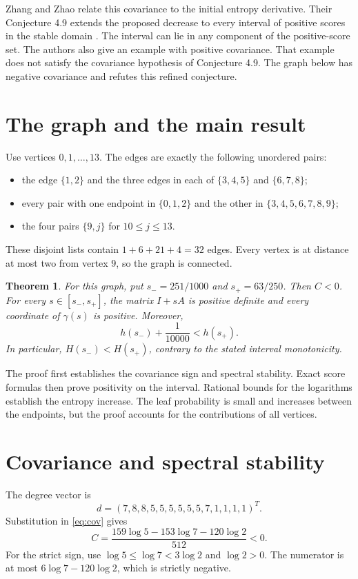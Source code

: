 \documentclass[11pt,a4paper]{article}
\newtheorem{theorem}{Theorem}
\begin{document}
Zhang and Zhao relate this covariance to the initial entropy derivative.
Their Conjecture 4.9 extends the proposed decrease to every interval of
positive scores in the stable domain \cite{zhangzhao}.
The interval can lie in any component of the positive-score set.
The authors also give an example with positive covariance.
That example does not satisfy the covariance hypothesis of Conjecture 4.9.
The graph below has negative covariance and refutes this refined conjecture.

\section{The graph and the main result}
Use vertices $0,1,\ldots,13$. The edges are exactly the following unordered pairs:
\begin{itemize}
\item the edge $\{1,2\}$ and the three edges in each of
$\{3,4,5\}$ and $\{6,7,8\}$;
\item every pair with one endpoint in $\{0,1,2\}$ and the other in
$\{3,4,5,6,7,8,9\}$;
\item the four pairs $\{9,j\}$ for $10\leq j\leq13$.
\end{itemize}
These disjoint lists contain $1+6+21+4=32$ edges.
Every vertex is at distance at most two from vertex $9$, so the graph is connected.

\begin{theorem}\label{thm:main}
For this graph, put $s_-=251/1000$ and $s_+=63/250$.
Then $C<0$. For every $s\in[s_-,s_+]$, the matrix $I+sA$ is positive
definite and every coordinate of $\gamma(s)$ is positive. Moreover,
\[
 h(s_-)+\frac1{10000}<h(s_+).
\]
In particular, $H(s_-)<H(s_+)$, contrary to the stated interval monotonicity.
\end{theorem}
The proof first establishes the covariance sign and spectral stability.
Exact score formulas then prove positivity on the interval.
Rational bounds for the logarithms establish the entropy increase.
The leaf probability is small and increases between the endpoints,
but the proof accounts for the contributions of all vertices.

\section{Covariance and spectral stability}
The degree vector is
\[
 d=(7,8,8,5,5,5,5,5,5,7,1,1,1,1)^T.
\]
Substitution in \eqref{eq:cov} gives
\begin{equation}\label{eq:covvalue}
 C=\frac{159\log5-153\log7-120\log2}{512}<0.
\end{equation}
For the strict sign, use $\log5\leq\log7<3\log2$ and $\log2>0$.
The numerator is at most $6\log7-120\log2$, which is strictly negative.
\end{document}
